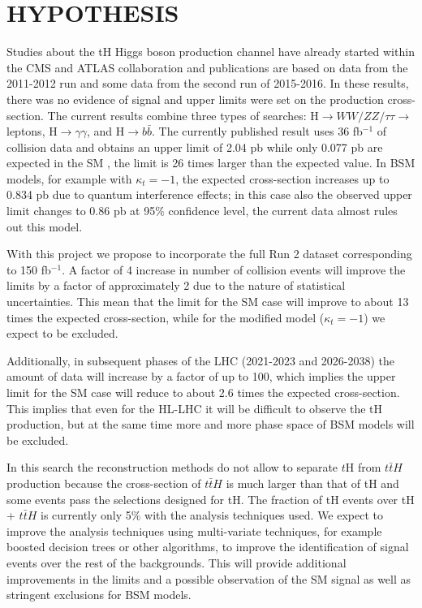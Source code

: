 \documentclass[final,3p]{CSP}
\begin{document}
\section{HYPOTHESIS}

\onehalfspacing Studies about the tH Higgs boson production channel have already started within the CMS and ATLAS collaboration and publications are based on data from the 2011-2012 run and some data from the second run of 2015-2016.
In these results, there was no evidence of signal and upper limits were set on the production cross-section.
The current results combine three types of searches: H$\rightarrow WW/ZZ/\tau\tau \rightarrow$leptons, H$\rightarrow\gamma\gamma$, and H$\rightarrow b\bar{b}$.
The currently published result uses 36 fb$^{-1}$ of collision data and obtains an upper limit of 2.04 pb while only 0.077 pb are expected in the SM \cite{sirunyan2019search}, the limit is 26 times larger than the expected value.
In BSM models, for example with $\kappa_t = -1$,  the expected cross-section increases up to 0.834 pb due to quantum interference effects; in this case also the observed upper limit changes to 0.86 pb at 95$\%$ confidence level, the current data almost rules out this model.  

With this project we propose to incorporate the full Run 2 dataset corresponding to 150 fb$^{-1}$.
A factor of 4 increase in number of collision events will improve the limits by a factor of approximately 2 due to the nature of statistical uncertainties.
This mean that the limit for the SM case will improve to about 13 times the expected cross-section, while for the modified model ($\kappa_t = -1$) we expect to be excluded.

Additionally, in subsequent phases of the LHC (2021-2023 and 2026-2038) the amount of data will increase by a factor of up to 100, which implies the upper limit for the SM case will reduce to about 2.6 times the expected cross-section. This implies that even for the HL-LHC it will be difficult to observe the tH production, but at the same time more and more phase space of BSM models will be excluded.  

In this search the reconstruction methods do not allow to separate $t$H from $t\bar{t}H$ production because the cross-section of $t\bar{t}H$ is much larger than that of tH and some events pass the selections designed for tH.
The fraction of tH events over tH + $t\bar{t}H$ is currently only 5$\%$ with the analysis techniques used.
We expect to improve the analysis techniques using multi-variate techniques, for example boosted decision trees or other algorithms, to improve the identification of signal events over the rest of the backgrounds.
This will provide additional improvements in the limits and a possible observation of the SM signal as well as stringent exclusions for BSM models.
\end{document}
